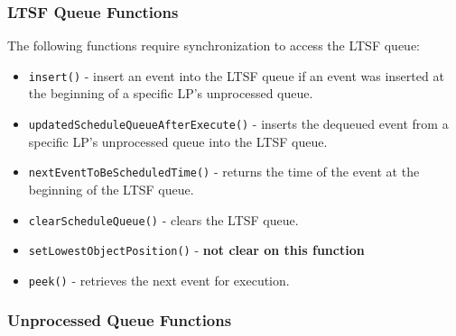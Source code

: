 \documentclass[a4paper]{article}
\let\origitem\item
\renewcommand{\item}{\normalfont\origitem}
\begin{document}
\subsubsection{\textbf{LTSF Queue Functions}}

The following functions require synchronization to access the LTSF
queue:\par
\begin{itemize}
\item\texttt{insert()} - insert an event into the LTSF queue if an event was inserted
at the beginning of a specific LP's unprocessed queue.
\item\texttt{updatedScheduleQueueAfterExecute()} - inserts the dequeued event from a
specific LP's unprocessed queue into the LTSF queue.
\item\texttt{nextEventToBeScheduledTime()} - returns the time of the event at the
beginning of the LTSF queue.
\item\texttt{clearScheduleQueue()} - clears the LTSF queue.
\item\texttt{setLowestObjectPosition()} - \textbf{not clear on this function}
\item\texttt{peek()} - retrieves the next event for execution.
\end{itemize}

\subsubsection{\textbf{Unprocessed Queue Functions}}
\end{document}
